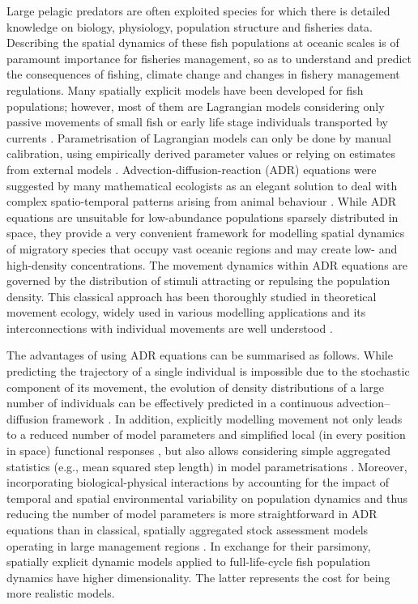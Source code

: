 Large pelagic predators are often exploited species for which there is detailed knowledge on biology, physiology, population structure and fisheries data. Describing the spatial dynamics of these fish populations at oceanic scales is of paramount importance for fisheries management, so as to understand and predict the consequences of fishing, climate change and changes in fishery management regulations. Many spatially explicit models have been developed for fish populations; however, most of them are Lagrangian models considering only passive movements of small fish or early life stage individuals transported by currents \citep*[see, e.g.,][]{DeAngelis, Rossi, Popova, Ramesh, vanSebille}. Parametrisation of Lagrangian models can only be done by manual calibration, using empirically derived parameter values or relying on estimates from external models \citep*[as in, e.g.,][]{Scutt}. Advection-diffusion-reaction (ADR) equations were suggested by many mathematical ecologists as an elegant solution to deal with complex spatio-temporal patterns arising from animal behaviour \citep*[see, e.g.,][]{Keller-Segel,Okubo80, Okubo-Levin, Murray, Grunbaum98, Grunbaum99, Flierl, Tyutyunov, TT, Berezovskaya,Petrovskii}. While ADR equations are unsuitable for low-abundance populations sparsely distributed in space, they provide a very convenient framework for modelling spatial dynamics of migratory species that occupy vast oceanic regions and may create low- and high-density concentrations. The movement dynamics within ADR equations are governed by the distribution of stimuli attracting or repulsing the population density. This classical approach has been thoroughly studied in theoretical movement ecology, widely used in various modelling applications and its interconnections with individual movements are well understood \citep{Okubo77, Okubo80, Grunbaum94, Grunbaum98, Grunbaum99,  Flierl, Turchin, Faugeras2007, Tyutyunov2013, TT}. 

The advantages of using ADR equations can be summarised as follows. While predicting the trajectory of a single individual is impossible due to the stochastic component of its movement, the evolution of density distributions of a large number of individuals can be effectively predicted in a continuous advection--diffusion framework \citep{Grunbaum99, Flierl, Tyutyunov}. In addition, explicitly modelling movement not only leads to a reduced number of model parameters and simplified local (in every position in space) functional responses \citep*[e.g.,][]{Arditi, TT}, but also allows considering simple aggregated statistics (e.g., mean squared step length) in model parametrisations \citep{Grunbaum98}. Moreover, incorporating biological-physical interactions by accounting for the impact of temporal and spatial environmental variability on population dynamics and thus reducing the number of model parameters is more straightforward in ADR equations \citep*[e.g.,][]{Grunbaum98, Flierl} than in classical, spatially aggregated stock assessment models operating in large management regions \citep{Punt}. In exchange for their parsimony, spatially explicit dynamic models applied to full-life-cycle fish population dynamics have higher dimensionality. The latter represents the cost for being more realistic models.\\


